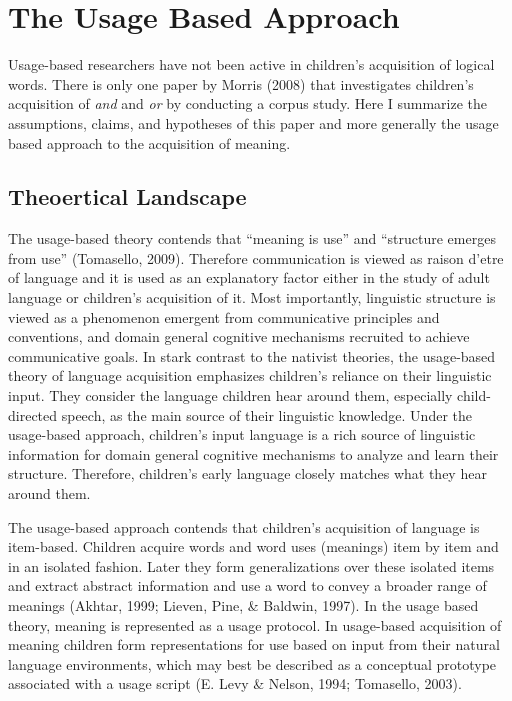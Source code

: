 \documentclass[oneside]{report}
\theoremstyle{definition}
\theoremstyle{definition}
\theoremstyle{definition}
\theoremstyle{remark}
\begin{document}
\section{The Usage Based Approach}\label{the-usage-based-approach}

Usage-based researchers have not been active in children's acquisition
of logical words. There is only one paper by Morris (2008) that
investigates children's acquisition of \emph{and} and \emph{or} by
conducting a corpus study. Here I summarize the assumptions, claims, and
hypotheses of this paper and more generally the usage based approach to
the acquisition of meaning.

\subsection{Theoertical Landscape}\label{theoertical-landscape}

The usage-based theory contends that ``meaning is use'' and ``structure
emerges from use'' (Tomasello, 2009). Therefore communication is viewed
as raison d'etre of language and it is used as an explanatory factor
either in the study of adult language or children's acquisition of it.
Most importantly, linguistic structure is viewed as a phenomenon
emergent from communicative principles and conventions, and domain
general cognitive mechanisms recruited to achieve communicative goals.
In stark contrast to the nativist theories, the usage-based theory of
language acquisition emphasizes children's reliance on their linguistic
input. They consider the language children hear around them, especially
child-directed speech, as the main source of their linguistic knowledge.
Under the usage-based approach, children's input language is a rich
source of linguistic information for domain general cognitive mechanisms
to analyze and learn their structure. Therefore, children's early
language closely matches what they hear around them.

The usage-based approach contends that children's acquisition of
language is item-based. Children acquire words and word uses (meanings)
item by item and in an isolated fashion. Later they form generalizations
over these isolated items and extract abstract information and use a
word to convey a broader range of meanings (Akhtar, 1999; Lieven, Pine,
\& Baldwin, 1997). In the usage based theory, meaning is represented as
a usage protocol. In usage-based acquisition of meaning children form
representations for use based on input from their natural language
environments, which may best be described as a conceptual prototype
associated with a usage script (E. Levy \& Nelson, 1994; Tomasello,
2003).
\end{document}
